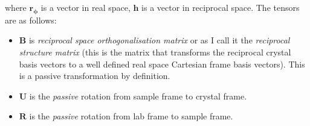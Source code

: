 \documentclass{article}
\begin{document}
where $\mathbf{r_{\phi}}$ is a vector in real space, $\mathbf{h}$ is a vector in reciprocal space. 
The tensors are as follows:
\begin{itemize}
\item $\mathbf{B}$ is \textit{reciprocal space orthogonalisation matrix} or as I call it the \textit{reciprocal structure matrix} (this is the matrix that transforms the reciprocal crystal basis vectors to a well defined real space Cartesian frame basis vectors). This is a passive transformation by definition.

\item $\mathbf{U}$ is the \textit{passive} rotation from sample frame to crystal frame. 

\item $\mathbf{R}$ is the \textit{passive} rotation from lab frame to sample frame. 
\end{itemize}
\end{document}
